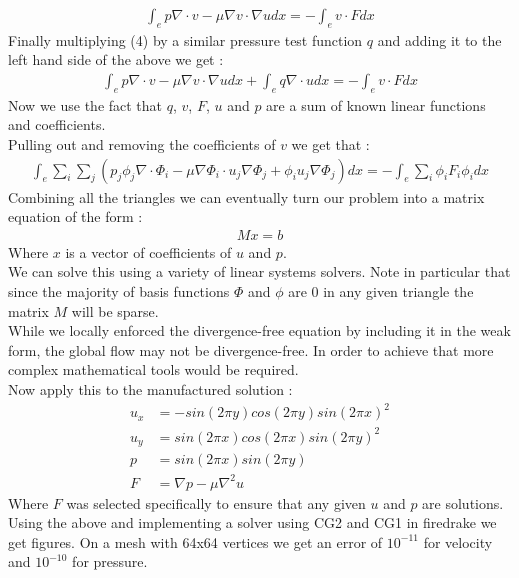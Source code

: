 \documentclass[11pt,twoside,a4paper]{article}
\begin{document}
\begin{align*}
\int_{e} p \nabla \cdot v - \mu \nabla v \cdot \nabla u dx = -\int_{e} v \cdot F dx
\end{align*}
Finally multiplying (4) by a similar pressure test function $q$ and adding it to the left hand side of the above we get :
\begin{align}
\int_{e} p \nabla \cdot v - \mu \nabla v \cdot \nabla u dx + \int_{e} q \nabla \cdot u dx = -\int_{e} v \cdot F dx
\end{align}
Now we use the fact that $q$, $v$, $F$, $u$ and $p$ are a sum of known linear functions and coefficients.\\
Pulling out and removing the coefficients of $v$ we get that :
\begin{align*}
 \int_{e} \sum_i \sum_j (  p_j \phi_j \nabla  \cdot \Phi_i - \mu \nabla \Phi_i \cdot u_j \nabla \Phi_j +   \phi_i u_j \nabla \Phi_j) dx = -\int_{e} \sum_i \phi_i F_i \phi_i dx
\end{align*}
Combining all the triangles we can eventually turn our problem into a matrix equation of the form :
\begin{align}
M x = b
\end{align}
Where $x$ is a vector of coefficients of $u$ and $p$.\\
We can solve this using a variety of linear systems solvers. Note in particular that since the majority of basis functions $\Phi$ and $\phi$ are $0$ in any given triangle the matrix $M$ will be sparse.\\
While we locally enforced the divergence-free equation by including it in the weak form, the global flow may not be divergence-free. In order to achieve that more complex mathematical tools would be required.\\
Now apply this to the manufactured solution :
\begin{align*}
u_x &=  -sin(2 \pi y) cos(2 \pi y)  sin(2 \pi x)^2 \\
u_y &= sin(2 \pi x) cos(2 \pi x)  sin(2 \pi y)^2 \\
p &= sin(2 \pi x) sin(2 \pi y) \\
F &= \nabla p - \mu \nabla^2 u
\end{align*}
Where $F$ was selected specifically to ensure that any given $u$ and $p$ are solutions.
Using the above and implementing a solver using CG2 and CG1 in firedrake we get figures. On a mesh with 64x64 vertices we get an error of $10^{-11}$ for velocity and $10^{-10}$ for pressure.\\
\end{document}
